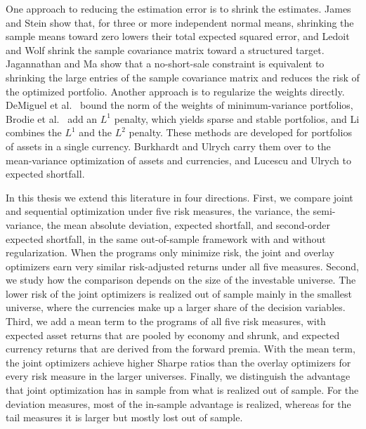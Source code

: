 One approach to reducing the estimation error is to shrink the estimates. James and Stein \cite{JamesStein1961} show
that, for three or more independent normal means, shrinking the sample means toward zero lowers their total expected
squared error, and Ledoit and Wolf \cite{LedoitWolf2003, LedoitWolf2004} shrink the sample covariance matrix toward a
structured target. Jagannathan and Ma \cite{JagannathanMa2003} show that a no-short-sale constraint is equivalent to
shrinking the large entries of the sample covariance matrix and reduces the risk of the optimized portfolio. Another
approach is to regularize the weights directly. DeMiguel et al.~\cite{DeMiguelGarlappiNogalesUppal2009} bound the norm
of the weights of minimum-variance portfolios, Brodie et al.~\cite{BrodieDaubechiesDeMolGiannoneLoris2009} add an $L^1$
penalty, which yields sparse and stable portfolios, and Li \cite{Li2015} combines the $L^1$ and the $L^2$ penalty. These
methods are developed for portfolios of assets in a single currency. Burkhardt and Ulrych
\cite{SparseAndStableInternationalPortfolioOptimization} carry them over to the mean-variance optimization of assets and
currencies, and Lucescu and Ulrych \cite{RegularizedMultiCurrencyExpectedShortfallPortfolios} to expected shortfall.

In this thesis we extend this literature in four directions. First, we compare joint and sequential optimization 
under five risk measures, the variance, the semi-variance, the mean absolute deviation, expected shortfall, and 
second-order expected shortfall, in the same out-of-sample framework with and without regularization. 
When the programs only minimize risk, the joint and overlay optimizers earn very similar risk-adjusted 
returns under all five measures. Second, we study how the comparison depends on the size of the 
investable universe. The lower risk of the joint optimizers is realized out of sample mainly in the 
smallest universe, where the currencies make up a larger share of the decision variables. 
Third, we add a mean term to the programs of all five risk measures, 
with expected asset returns that are pooled by economy and shrunk, and expected 
currency returns that are derived from the forward premia. With the mean term, 
the joint optimizers achieve higher Sharpe ratios than the overlay optimizers 
for every risk measure in the larger universes. 
Finally, we distinguish the advantage that joint optimization has in sample from 
what is realized out of sample. For the deviation measures, most of the in-sample advantage 
is realized, whereas for the tail measures it is larger but mostly lost out of sample.

